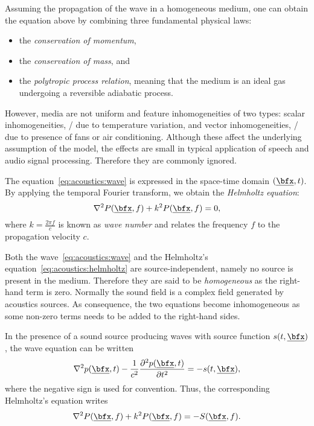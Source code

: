 \mynewline
Assuming the propagation of the wave in a homogeneous medium, one can obtain the equation above by combining three fundamental physical laws:
\begin{itemize}
    \item the \textit{conservation of momentum},
    \item the \textit{conservation of mass}, and
    \item the \textit{polytropic process relation}, meaning that the medium is an ideal gas undergoing a reversible adiabatic process.
\end{itemize}

However, media are not uniform and feature inhomogeneities of two types:
scalar inhomogeneities, \eg/ due to temperature variation,
and vector inhomogeneities, \eg/ due to presence of fans or air conditioning.
Although these affect the underlying assumption of the model, the effects are small in typical application of speech and audio signal processing.
Therefore they are commonly ignored.

The equation~\ref{eq:acoustics:wave} is expressed in the space-time domain $\depSpaceTime$.
By applying the temporal Fourier transform, we obtain the \textit{Helmholtz equation}:
\begin{equation}
    \label{eq:acoustics:helmholtz}
    \knabla^2 P(\positionMicrophone, f) + k^2 P(\positionMicrophone, f) = 0
    ,
\end{equation}
where $k = \frac{2 \pi f}{c}$  is known as \textit{wave number} and relates the frequency $f$ to the propagation velocity $c$.

Both the wave~\ref{eq:acoustics:wave} and the Helmholtz's equation~\ref{eq:acoustics:helmholtz} are source-independent,
namely no source is present in the medium.
Therefore they are said to be \textit{homogeneous} as the right-hand term is zero.
Normally the sound field is a complex field generated by acoustics sources.
As consequence, the two equations become inhomogeneous as some non-zero terms needs to be added to the right-hand sides.

In the presence of a sound source producing waves with source function $s(t, \positionMicrophone)$, the wave equation can be written
\begin{equation}
    \label{eq:acoustics:source}
    \knabla^2 \pressureSpaceTime - \frac{1}{\speedOfSound^2} \kpderiv[2]{\pressureSpaceTime}{t} = -s(t, \positionMicrophone)
    ,
\end{equation}
where the negative sign is used for convention. Thus, the corresponding Helmholtz's equation writes
\begin{equation}
    \label{eq:acoustics:source_freq}
    \knabla^2 P(\positionMicrophone, f) + k^2 P(\positionMicrophone, f) = - S(\positionMicrophone, f)
    .
\end{equation}

